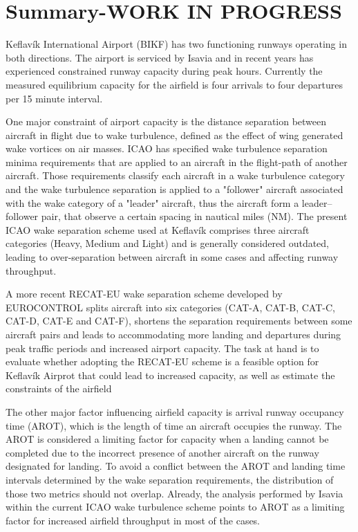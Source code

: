 


\chapter{Summary-WORK IN PROGRESS}\label{cha:summary}

Keflavík International Airport (BIKF) has two functioning runways operating in both directions. The airport is serviced by Isavia and in recent years has experienced constrained runway capacity during peak hours. Currently the measured equilibrium capacity for the airfield is four arrivals to four departures per 15 minute interval. 

One major constraint of airport capacity is the distance separation between aircraft in flight due to wake turbulence, defined as the effect of wing generated wake vortices on air masses. ICAO has specified wake turbulence separation minima requirements that are applied to an aircraft in the flight-path of another aircraft. Those requirements classify each aircraft in a wake turbulence category and the wake turbulence separation is applied to a "follower" aircraft associated with the wake category of a "leader" aircraft, thus the aircraft form a leader--follower pair, that observe a certain spacing in nautical miles (NM). The present ICAO wake separation scheme used at Keflavík comprises three aircraft categories (Heavy, Medium and Light) and is generally considered outdated, leading to over-separation between aircraft in some cases and affecting runway throughput. 

A more recent RECAT-EU wake separation scheme developed by EUROCONTROL splits aircraft into six categories (CAT-A, CAT-B, CAT-C, CAT-D, CAT-E and CAT-F), shortens the separation requirements between some aircraft pairs and leads to accommodating more landing and departures during peak traffic periods and increased airport capacity. The task at hand is to evaluate whether adopting the RECAT-EU scheme is a feasible option for Keflavík Airprot that could lead to increased capacity, as well as estimate the constraints of the airfield

The other major factor influencing airfield capacity is arrival runway occupancy time (AROT), which is the length of time an aircraft occupies the runway. The AROT is considered a limiting factor for capacity when a landing cannot be completed due to the incorrect presence of another aircraft on the runway designated for landing.
To avoid a conflict between the AROT and landing time intervals determined by the wake separation requirements, the distribution of those two metrics should not overlap.
Already, the analysis performed by Isavia within the current ICAO wake turbulence scheme points to AROT as a limiting factor for increased airfield throughput in most of the cases.  

